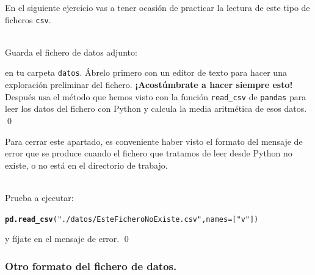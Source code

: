 \documentclass[10pt,a4paper]{article}\usepackage[]{graphicx}\usepackage[]{color}
\makeatletter
\newcommand{\hlstr}[1]{\textcolor[rgb]{0.192,0.494,0.8}{#1}}%
\newcommand{\hlkwd}[1]{\textcolor[rgb]{0.737,0.353,0.396}{\textbf{#1}}}%
\newenvironment{kframe}{%
 \def\at@end@of@kframe{}%
 \ifinner\ifhmode%
  \def\at@end@of@kframe{\end{minipage}}%
  \begin{minipage}{\columnwidth}%
 \fi\fi%
 \def\FrameCommand##1{\hskip\@totalleftmargin \hskip-\fboxsep
 \colorbox{shadecolor}{##1}\hskip-\fboxsep
     \hskip-\linewidth \hskip-\@totalleftmargin \hskip\columnwidth}%
 \MakeFramed {\advance\hsize-\width
   \@totalleftmargin\z@ \linewidth\hsize
   \@setminipage}}%
 {\par\unskip\endMakeFramed%
 \at@end@of@kframe}
\newenvironment{knitrout}{}{} %
\makeatother
\begin{document}
En el siguiente ejercicio vas a tener ocasión de practicar la lectura de este tipo de ficheros {\tt csv}.
\begin{ejercicio}
\label{tut02:ejercicio20}
\quad\\

Guarda el fichero de datos adjunto:
\begin{center}
\end{center}
en tu carpeta {\tt datos}. Ábrelo primero con un editor de texto para hacer una exploración preliminar del fichero. {\bf ¡Acostúmbrate a hacer siempre esto!} Después usa el método que hemos visto con la función {\tt read\_csv} de {\tt pandas} para leer los datos del fichero con Python y calcula la media aritmética de esos datos.
\qed
\end{ejercicio}
Para cerrar este apartado, es conveniente haber visto el formato del mensaje de error que se produce cuando el fichero que tratamos de leer desde Python no existe, o no está en el directorio de trabajo.
\begin{ejercicio}
\label{tut02:ejercicio21}
\quad\\
Prueba a ejecutar:
\begin{knitrout}
\color{fgcolor}\begin{kframe}
\begin{alltt}
\hlkwd{pd.read_csv}(\hlstr{"./datos/EsteFicheroNoExiste.csv"}, names=[\hlstr{"v"}])
\end{alltt}
\end{kframe}
\end{knitrout}
y fíjate en el mensaje de error.
\qed
\end{ejercicio}

\subsubsection*{Otro formato del fichero de datos.}
\label{tut02:subsubsec:otroFormatoFicheroDatos}

\end{document}

